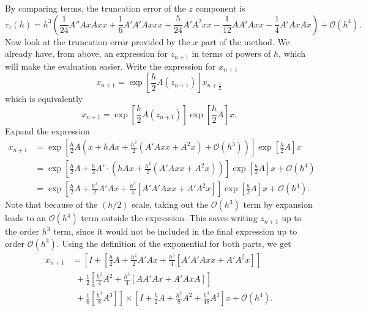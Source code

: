 By comparing terms, the truncation error of the $z$ component is
\begin{equation}
    \tau_z(h) = h^3 \left( \frac{1}{24}A''AxAxx + \frac{1}{6}A'A'A xxx + \frac{5}{24} A' A^2 xx - \frac{1}{12}A A' A xx - \frac{1}{4}A' Ax Ax \right) + \mathcal{O}(h^4).
    \label{eqn:strangtruncz}
\end{equation}
Now look at the truncation error provided by the $x$ part of the method.
We already have, from above, an expression for $z_{n+1}$ in terms of powers of $h$, which will make the evaluation easier.
Write the expression for $x_{n+1}$
\begin{equation*}
    x_{n+1} = \exp \left[ \frac{h}{2} A(z_{n+1}) \right] x_{n+\frac{1}{2}}
\end{equation*}
which is equivalently
\begin{equation}
    x_{n+1} = \exp \left[ \frac{h}{2} A(z_{n+1}) \right] \exp \left[ \frac{h}{2} A \right] x.
    \label{eqn:strangx}
\end{equation}
Expand the expression
\begin{align*}
    x_{n+1} &= \exp \left[
        \frac{h}{2}A \left( x + h Ax + \frac{h^2}{2} \left( A' A xx + A^2 x \right) + \mathcal{O}(h^3) \right)
    \right] \exp \left[
        \frac{h}{2}A
    \right] x \\
    &= \exp \left[
        \frac{h}{2}A + \frac{h}{2} A' \cdot \left( h Ax + \frac{h^2}{2}\left( A' A xx + A^2 x \right) \right)
    \right] \exp \left[
        \frac{h}{2}A
    \right] x + \mathcal{O}(h^4) \\
    &= \exp \left[
        \frac{h}{2}A + \frac{h^2}{2}A'Ax + \frac{h^3}{4} \left[ A' A' A xx + A' A^2 x \right]
    \right] \exp \left[
        \frac{h}{2}A
    \right] x + \mathcal{O}(h^4).
\end{align*}
Note that because of the $(h/2)$ scale, taking out the $\mathcal{O}(h^3)$ term by expansion leads to an $\mathcal{O}(h^4)$ term outside the expression.
This saves writing $z_{n+1}$ up to the order $h^3$ term, since it would not be included in the final expression up to order $\mathcal{O}(h^3)$.
Using the definition of the exponential for both parts, we get
\begin{align*}
    x_{n+1} &= \left[
        I + \left[ \frac{h}{2}A + \frac{h^2}{2} A' Ax + \frac{h^3}{4} \left[ A' A' A xx + A' A^2 x \right] \right] \right. \\
        &~~ + \frac{1}{2}\left[ \frac{h^2}{4}A^2 + \frac{h^3}{4} \left[ AA'Ax + A' AxA \right] \right] \\
        &~~ + \left. \frac{1}{6} \left[ \frac{h^3}{8}A^3 \right]
    \right] \times \left[
        I + \frac{h}{2}A + \frac{h^2}{8}A^2 + \frac{h^3}{48}A^3
    \right]x + \mathcal{O}(h^4).
\end{align*}
